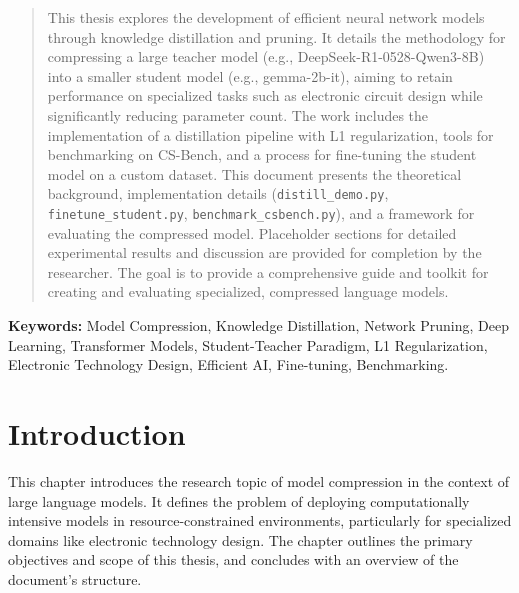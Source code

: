 \documentclass[12pt, a4paper]{report}
\begin{document}
\begin{abstract}
\noindent This thesis explores the development of efficient neural network models through knowledge distillation and pruning. It details the methodology for compressing a large teacher model (e.g., DeepSeek-R1-0528-Qwen3-8B) into a smaller student model (e.g., gemma-2b-it), aiming to retain performance on specialized tasks such as electronic circuit design while significantly reducing parameter count. The work includes the implementation of a distillation pipeline with L1 regularization, tools for benchmarking on CS-Bench, and a process for fine-tuning the student model on a custom dataset. This document presents the theoretical background, implementation details (\texttt{distill\_demo.py}, \texttt{finetune\_student.py}, \texttt{benchmark\_csbench.py}), and a framework for evaluating the compressed model. Placeholder sections for detailed experimental results and discussion are provided for completion by the researcher. The goal is to provide a comprehensive guide and toolkit for creating and evaluating specialized, compressed language models.
\end{abstract}

\noindent\textbf{Keywords:} Model Compression, Knowledge Distillation, Network Pruning, Deep Learning, Transformer Models, Student-Teacher Paradigm, L1 Regularization, Electronic Technology Design, Efficient AI, Fine-tuning, Benchmarking.

\cleardoublepage %

\tableofcontents
\cleardoublepage


\listoffigures
\cleardoublepage


\cleardoublepage
{}

\chapter{Introduction}
\label{chap:introduction}
This chapter introduces the research topic of model compression in the context of large language models. It defines the problem of deploying computationally intensive models in resource-constrained environments, particularly for specialized domains like electronic technology design. The chapter outlines the primary objectives and scope of this thesis, and concludes with an overview of the document's structure.
\end{document}
